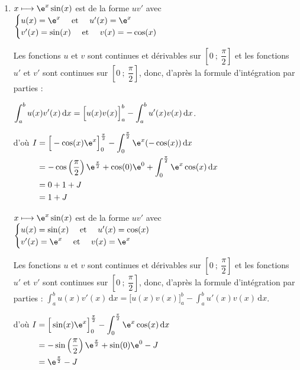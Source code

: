 \begin{enumerate}
\item

$x \longmapsto \e^x \sin(x)$ est de la forme $u v'$ avec $\begin{cases}u(x)=\e^x \quad\text { et }  \quad u'(x)=\e^x \\ v'(x)=\sin(x) \quad\text { et } \quad v(x)=-\cos(x)\end{cases}$

Les fonctions $u$ et $v$ sont continues et dérivables sur $\left[0~;~\dfrac{\pi}{2}\right]$ et les fonctions $u'$ et $v'$ sont continues sur $\left[0~;~\dfrac{\pi}{2}\right]$, donc, d'après la formule d'intégration par parties :

$\displaystyle \int_{a}^{b} u(x)v'(x)\, \mathrm{d}x = \Big [ u(x)v(x)\strut\Big]_{a}^{b} - \int_{a}^{b} u'(x)v(x) \, \mathrm{d}x$.

d'où 
$\begin{aligned}[t]
	I & =\Big[-\cos(x)\e^x\Big]_0^{\frac{\pi}{2}}-\int_0^{\frac{\pi}{2}} \e^x(-\cos(x))  \, \mathrm{d}x\\
	& = -\cos \left(\dfrac{\pi}{2}\right)\e^{\frac{\pi}{2}}+\cos(0)\e^0+\int_0^{\frac{\pi}{2}} \e^x\cos(x) \, \mathrm{d}x\\
	& =0+1+J\\
	& =1+ J
\end{aligned}$

\smallskip

$x \longmapsto \e^x \sin(x)$ est de la forme $u v'$ avec $\begin{cases}u(x)=\sin(x) \quad\text { et }\quad u'(x)=\cos(x)\\ v'(x)=\e^x \quad \text { et } \quad v(x)=\e^x \end{cases}$

Les fonctions $u$ et $v$ sont continues et dérivables sur $\left[0~;~\dfrac{\pi}{2}\right]$ et  les fonctions $u'$ et $v'$ sont continues sur $\left[0~;~\dfrac{\pi}{2}\right]$, donc, d'après la formule d'intégration par parties :
$\displaystyle \int_{a}^{b} u(x)v'(x)\, \mathrm{d}x = \Big [ u(x)v(x)\Big]_{a}^{b} - \int_{a}^{b} u'(x)v(x) \, \mathrm{d}x$.

d'où 
$\begin{aligned}[t]
	I & =\Big[\sin(x)\e^x\Big]_0^{\frac{\pi}{2}}-\int_0^{\frac{\pi}{2}} \e^x\cos(x)  \, \mathrm{d}x \\
	& = -\sin \left(\dfrac{\pi}{2}\right)\e^{\frac{\pi}{2}}+\sin(0)\e^0-J\\
	& =\e^{\frac{\pi}{2}} - J
\end{aligned}
$


\end{enumerate}
